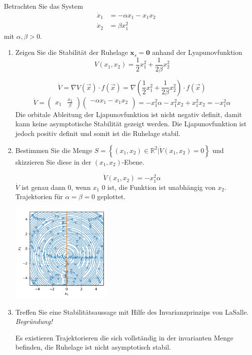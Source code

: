 \documentclass[crop=false]{standalone}
\begin{document}
\begin{task}
Betrachten Sie das System
\[ 
\begin{aligned} \dot{x}_{1} &=-\alpha x_{1}-x_{1} x_{2} \\ \dot{x}_{2} &=\beta x_{1}^{2} \end{aligned}
 \]
 mit $\alpha, \beta>0$.
 \begin{enumerate}[i]
     \item Zeigen Sie die Stabilität der Ruhelage $\mathbf{x}_{s}=\mathbf{0}$ anhand der Lyapunovfunktion
     \[ 
V\left(x_{1}, x_{2}\right)=\frac{1}{2} x_{1}^{2}+\frac{1}{2 \beta} x_{2}^{2}
 \]
 \begin{solution}
    \[\dot{V} = \nabla V(\vec{x}) \cdot f(\vec{x}) = \nabla \left( \frac{1}{2} x_{1}^{2}+\frac{1}{2 \beta} x_{2}^{2} \right) \cdot f(\vec{x})\]
    \[\dot{V} = \begin{pmatrix}
    x_1 & \frac{x_2}{\beta}
    \end{pmatrix}
    \begin{pmatrix}
    -\alpha x_1 - x_1 x_2 \\
    \end{pmatrix}
    = - x_1^2 \alpha - x_1^2 x_2 + x_1^2 x_2
    = -x_1^2 \alpha
    \]
    Die orbitale Ableitung der Ljapunovfunktion ist nicht negativ definit, damit kann keine asymptotische Stabilität gezeigt werden. Die Ljapunovfunktion ist jedoch positiv definit und somit ist die Ruhelage stabil.
    \end{solution}
 \item Bestimmen Sie die Menge $S=\left\{\left(x_{1}, x_{2}\right) \in \mathbb{R}^{2} | \dot{V}\left(x_{1}, x_{2}\right)=0\right\}$ und skizzieren Sie diese in der $\left(x_{1}, x_{2}\right)$-Ebene.
 \begin{solution}
    \[\dot{V}\left(x_{1}, x_{2}\right)=-x_1^2 \alpha\]
    $\dot{V}$ ist genau dann $0$, wenn $x_1$ $0$ ist, die Funktion ist unabhängig von $x_2$. Trajektorien für $\alpha = \beta =  0$ geplottet. 
    
        {\centering
        \includegraphics[width = 5cm]{LaSalle2017.pdf}
        \par}
    \end{solution}
\item Treffen Sie eine Stabilitätsaussage mit Hilfe des Invarianzprinzips von LaSalle. \emph{Begründung!}
\begin{solution}
    Es existieren Trajektorieren die sich vollständig in der invarianten Menge befinden, die Ruhelage ist nicht asymptotisch stabil.
    \end{solution}
 \end{enumerate}
\end{task}
\end{document}
